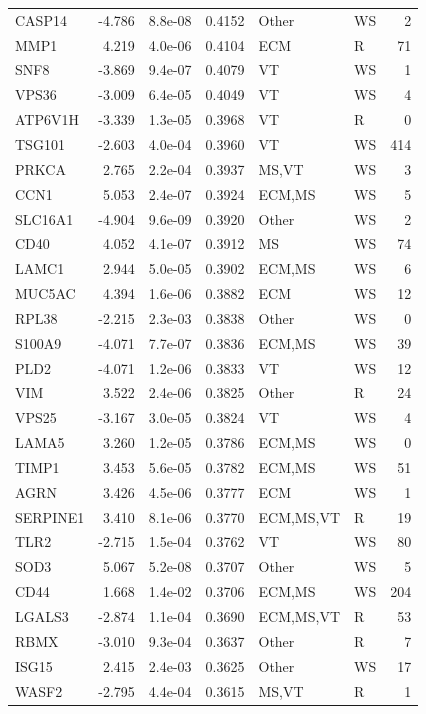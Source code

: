 \begin{table}[ht]
\begin{tabular}{lrlrllr}
  CASP14 & -4.786 & 8.8e-08 & 0.4152 & Other & WS & 2 \\ 
  MMP1 & 4.219 & 4.0e-06 & 0.4104 & ECM & R & 71 \\ 
  SNF8 & -3.869 & 9.4e-07 & 0.4079 & VT & WS & 1 \\ 
  VPS36 & -3.009 & 6.4e-05 & 0.4049 & VT & WS & 4 \\ 
  ATP6V1H & -3.339 & 1.3e-05 & 0.3968 & VT & R & 0 \\ 
  TSG101 & -2.603 & 4.0e-04 & 0.3960 & VT & WS & 414 \\ 
  PRKCA & 2.765 & 2.2e-04 & 0.3937 & MS,VT & WS & 3 \\ 
  CCN1 & 5.053 & 2.4e-07 & 0.3924 & ECM,MS & WS & 5 \\ 
  SLC16A1 & -4.904 & 9.6e-09 & 0.3920 & Other & WS & 2 \\ 
  CD40 & 4.052 & 4.1e-07 & 0.3912 & MS & WS & 74 \\ 
  LAMC1 & 2.944 & 5.0e-05 & 0.3902 & ECM,MS & WS & 6 \\ 
  MUC5AC & 4.394 & 1.6e-06 & 0.3882 & ECM & WS & 12 \\ 
  RPL38 & -2.215 & 2.3e-03 & 0.3838 & Other & WS & 0 \\ 
  S100A9 & -4.071 & 7.7e-07 & 0.3836 & ECM,MS & WS & 39 \\ 
  PLD2 & -4.071 & 1.2e-06 & 0.3833 & VT & WS & 12 \\ 
  VIM & 3.522 & 2.4e-06 & 0.3825 & Other & R & 24 \\ 
  VPS25 & -3.167 & 3.0e-05 & 0.3824 & VT & WS & 4 \\ 
  LAMA5 & 3.260 & 1.2e-05 & 0.3786 & ECM,MS & WS & 0 \\ 
  TIMP1 & 3.453 & 5.6e-05 & 0.3782 & ECM,MS & WS & 51 \\ 
  AGRN & 3.426 & 4.5e-06 & 0.3777 & ECM & WS & 1 \\ 
  SERPINE1 & 3.410 & 8.1e-06 & 0.3770 & ECM,MS,VT & R & 19 \\ 
  TLR2 & -2.715 & 1.5e-04 & 0.3762 & VT & WS & 80 \\ 
  SOD3 & 5.067 & 5.2e-08 & 0.3707 & Other & WS & 5 \\ 
  CD44 & 1.668 & 1.4e-02 & 0.3706 & ECM,MS & WS & 204 \\ 
  LGALS3 & -2.874 & 1.1e-04 & 0.3690 & ECM,MS,VT & R & 53 \\ 
  RBMX & -3.010 & 9.3e-04 & 0.3637 & Other & R & 7 \\ 
  ISG15 & 2.415 & 2.4e-03 & 0.3625 & Other & WS & 17 \\ 
  WASF2 & -2.795 & 4.4e-04 & 0.3615 & MS,VT & R & 1 \\ 

\end{tabular}
\end{table}
